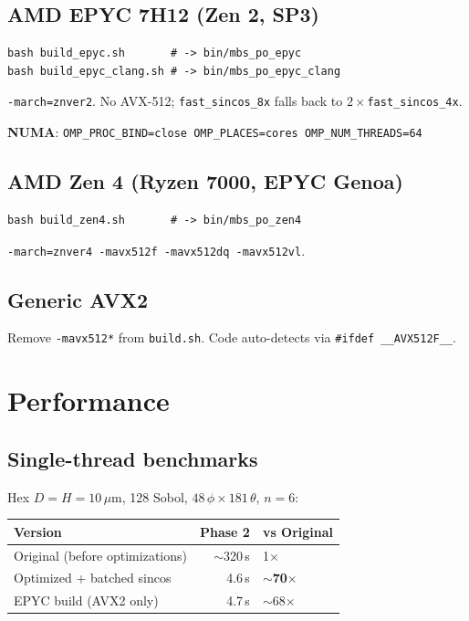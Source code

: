\documentclass[11pt,a4paper]{article}
\begin{document}
\subsection{AMD EPYC 7H12 (Zen 2, SP3)}
\begin{lstlisting}
bash build_epyc.sh       # -> bin/mbs_po_epyc
bash build_epyc_clang.sh # -> bin/mbs_po_epyc_clang
\end{lstlisting}
\texttt{-march=znver2}. No AVX-512; \texttt{fast\_sincos\_8x} falls back to $2\times$\texttt{fast\_sincos\_4x}.

\textbf{NUMA}: \texttt{OMP\_PROC\_BIND=close OMP\_PLACES=cores OMP\_NUM\_THREADS=64}

\subsection{AMD Zen 4 (Ryzen 7000, EPYC Genoa)}
\begin{lstlisting}
bash build_zen4.sh       # -> bin/mbs_po_zen4
\end{lstlisting}
\texttt{-march=znver4 -mavx512f -mavx512dq -mavx512vl}.

\subsection{Generic AVX2}
Remove \texttt{-mavx512*} from \texttt{build.sh}. Code auto-detects via \texttt{\#ifdef \_\_AVX512F\_\_}.

\section{Performance}

\subsection{Single-thread benchmarks}

Hex $D{=}H{=}10\,\mu$m, 128 Sobol, $48\,\phi \times 181\,\theta$, $n{=}6$:

\begin{tabular}{lrl}
\toprule
Version & Phase 2 & vs Original \\
\midrule
Original (before optimizations) & $\sim$320\,s & 1$\times$ \\
Optimized + batched sincos      & 4.6\,s & \textbf{$\sim$70$\times$} \\
EPYC build (AVX2 only)          & 4.7\,s & $\sim$68$\times$ \\
\bottomrule
\end{tabular}
\end{document}
